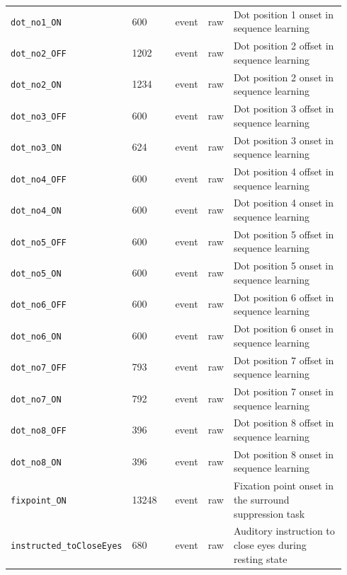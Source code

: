 {\begin{tcolorbox}
\begin{tabular}{@{}p{0.1567\linewidth}p{0.1567\linewidth}p{0.0783\linewidth}p{0.0783\linewidth}p{0.4700\linewidth}@{}}
\texttt{dot\_\allowbreak{}no1\_\allowbreak{}ON} & 600 & event & raw & Dot position 1 onset in sequence learning \\
\texttt{dot\_\allowbreak{}no2\_\allowbreak{}OFF} & 1202 & event & raw & Dot position 2 offset in sequence learning \\
\texttt{dot\_\allowbreak{}no2\_\allowbreak{}ON} & 1234 & event & raw & Dot position 2 onset in sequence learning \\
\texttt{dot\_\allowbreak{}no3\_\allowbreak{}OFF} & 600 & event & raw & Dot position 3 offset in sequence learning \\
\texttt{dot\_\allowbreak{}no3\_\allowbreak{}ON} & 624 & event & raw & Dot position 3 onset in sequence learning \\
\texttt{dot\_\allowbreak{}no4\_\allowbreak{}OFF} & 600 & event & raw & Dot position 4 offset in sequence learning \\
\texttt{dot\_\allowbreak{}no4\_\allowbreak{}ON} & 600 & event & raw & Dot position 4 onset in sequence learning \\
\texttt{dot\_\allowbreak{}no5\_\allowbreak{}OFF} & 600 & event & raw & Dot position 5 offset in sequence learning \\
\texttt{dot\_\allowbreak{}no5\_\allowbreak{}ON} & 600 & event & raw & Dot position 5 onset in sequence learning \\
\texttt{dot\_\allowbreak{}no6\_\allowbreak{}OFF} & 600 & event & raw & Dot position 6 offset in sequence learning \\
\texttt{dot\_\allowbreak{}no6\_\allowbreak{}ON} & 600 & event & raw & Dot position 6 onset in sequence learning \\
\texttt{dot\_\allowbreak{}no7\_\allowbreak{}OFF} & 793 & event & raw & Dot position 7 offset in sequence learning \\
\texttt{dot\_\allowbreak{}no7\_\allowbreak{}ON} & 792 & event & raw & Dot position 7 onset in sequence learning \\
\texttt{dot\_\allowbreak{}no8\_\allowbreak{}OFF} & 396 & event & raw & Dot position 8 offset in sequence learning \\
\texttt{dot\_\allowbreak{}no8\_\allowbreak{}ON} & 396 & event & raw & Dot position 8 onset in sequence learning \\
\texttt{fixpoint\_\allowbreak{}ON} & 13248 & event & raw & Fixation point onset in the surround suppression task \\
\texttt{instructed\_\allowbreak{}toCloseEyes} & 680 & event & raw & Auditory instruction to close eyes during resting state \\

\end{tabular}
\end{tcolorbox}}
